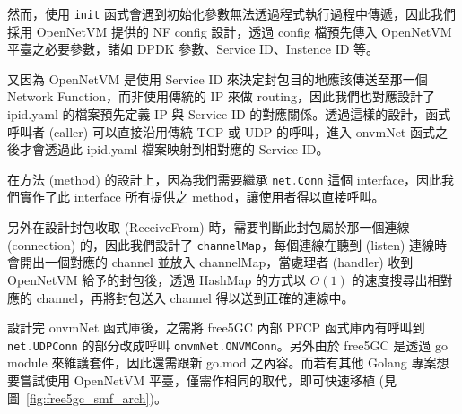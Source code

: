 然而，使用 \lstinline[language=Go]{init} 函式會遇到初始化參數無法透過程式執行過程中傳遞，因此我們採用 OpenNetVM 提供的 NF config 設計，透過 config 檔預先傳入 OpenNetVM 平臺之必要參數，諸如 DPDK 參數、Service ID、Instence ID 等。

又因為 OpenNetVM 是使用 Service ID 來決定封包目的地應該傳送至那一個 Network Function，而非使用傳統的 IP 來做 routing，因此我們也對應設計了 ipid.yaml 的檔案預先定義 IP 與 Service ID 的對應關係。透過這樣的設計，函式呼叫者 (caller) 可以直接沿用傳統 TCP 或 UDP 的呼叫，進入 onvmNet 函式之後才會透過此 ipid.yaml 檔案映射到相對應的 Service ID。

在方法 (method) 的設計上，因為我們需要繼承 \lstinline[language=Go]{net.Conn} 這個 interface，因此我們實作了此 interface 所有提供之 method，讓使用者得以直接呼叫。

另外在設計封包收取 (ReceiveFrom) 時，需要判斷此封包屬於那一個連線 (connection) 的，因此我們設計了 \lstinline{channelMap}，每個連線在聽到 (listen) 連線時會開出一個對應的 channel 並放入 channelMap，當處理者 (handler) 收到 OpenNetVM 給予的封包後，透過 HashMap 的方式以 $O(1)$ 的速度搜尋出相對應的 channel，再將封包送入 channel 得以送到正確的連線中。

設計完 onvmNet 函式庫後，之需將 free5GC 內部 PFCP 函式庫內有呼叫到 \lstinline[language=Go]{net.UDPConn} 的部分改成呼叫 \lstinline[language=Go]{onvmNet.ONVMConn}。另外由於 free5GC 是透過 go module 來維護套件，因此還需跟新 go.mod 之內容。而若有其他 Golang 專案想要嘗試使用 OpenNetVM 平臺，僅需作相同的取代，即可快速移植 (見圖~\ref{fig:free5gc_smf_arch})。

